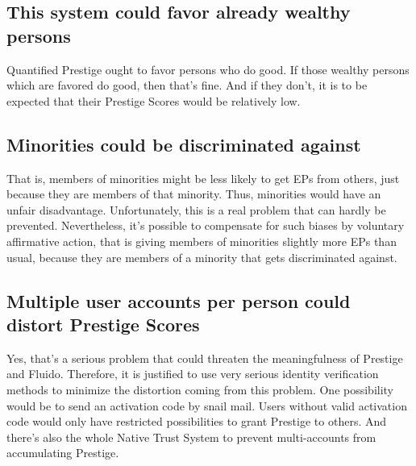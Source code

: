 \documentclass[a4paper,12pt]{scrartcl}
\begin{document}
\subsection{This system could favor already wealthy persons}
Quantified Prestige ought to favor persons who do good. If those wealthy persons which are favored do good, then that's fine. And if they don't, it is to be expected that their Prestige Scores would be relatively low.

\subsection{Minorities could be discriminated against}
That is, members of minorities might be less likely to get EPs from others, just because they are members of that minority. Thus, minorities would have an unfair disadvantage. Unfortunately, this is a real problem that can hardly be prevented. Nevertheless, it's possible to compensate for such biases by voluntary affirmative action, that is giving members of minorities slightly more EPs than usual, because they are members of a minority that gets discriminated against.

\subsection{Multiple user accounts per person could distort Prestige Scores}
Yes, that's a serious problem that could threaten the meaningfulness of Prestige and Fluido. Therefore, it is justified to use very serious identity verification methods to minimize the distortion coming from this problem. One possibility would be to send an activation code by snail mail. Users without valid activation code would only have restricted possibilities to grant Prestige to others. And there's also the whole Native Trust System to prevent multi-accounts from accumulating Prestige.
\end{document}
